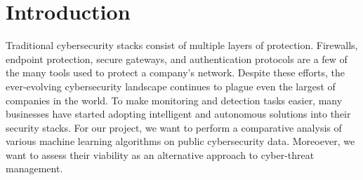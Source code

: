 \documentclass[
11pt, %
letterpaper, %
oneside, %
headinclude,footinclude, %
BCOR5mm, %
]{scrartcl}
\title{\normalfont{Mid-Term Report}} %
\subtitle{\normalfont{$CS5350$ Machine Learning Exploratory Project}}
\author{\spacedlowsmallcaps{Tyler Jones and Vijay Bajracharya}} %
\date{} %
\begin{document}

\renewcommand{\sectionmark}[1]{\markright{\spacedlowsmallcaps{#1}}} %
\lehead{\mbox{\llap{\small\thepage\kern1em\color{halfgray} \vline}\color{halfgray}\hspace{0.5em}\rightmark\hfil}} %

\pagestyle{scrheadings} %


\maketitle %


\setcounter{tocdepth}{2} %

\tableofcontents %




\section{Introduction}

Traditional cybersecurity stacks consist of multiple layers of protection. Firewalls, endpoint protection, secure gateways, and authentication protocols are a few of the many tools used to protect a company’s network. Despite these efforts, the ever-evolving cybersecurity landscape continues to plague even the largest of companies in the world. To make monitoring and detection tasks easier, many businesses have started adopting intelligent and autonomous solutions into their security stacks. For our project, we want to perform a comparative analysis of various machine learning algorithms on public cybersecurity data. Moreoever, we want to assess their viability as an alternative approach to cyber-threat management. 
\end{document}
